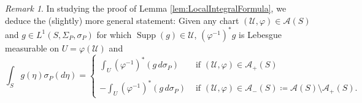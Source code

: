 \documentclass[11pt]{article}
\theoremstyle{remark}
\newtheorem{remark}{Remark}
\newcommand\supp{\operatorname{Supp}}
\begin{document}
\begin{remark}\label{rmk:LocalIntegralFormula}
In studying the proof of Lemma \ref{lem:LocalIntegralFormula}, we deduce the (slightly) more general statement: Given any chart $(\mathcal{U},\varphi)\in\mathcal{A}(S)$ and $g\in L^1(S,\Sigma_P,\sigma_P)$ for which $\supp(g)\in\mathcal{U}$, $(\varphi^{-1})^*g$ is Lebesgue measurable on $U=\varphi(\mathcal{U})$ and 
\begin{equation*}
    \int_S g(\eta)\sigma_P(d\eta)=\begin{cases}
    \displaystyle\int_U(\varphi^{-1})^*(g\,d\sigma_P) &\mbox{ if }(\mathcal{U},\varphi)\in\mathcal{A}_+(S)\\
    &\\
    -\displaystyle\int_U(\varphi^{-1})^*(g\,d\sigma_P)&\mbox{ if }(\mathcal{U},\varphi)\in\mathcal{A}_-(S)\coloneqq\mathcal{A}(S)\setminus\mathcal{A}_+(S).
    \end{cases}
\end{equation*}
\end{remark}
\end{document}
